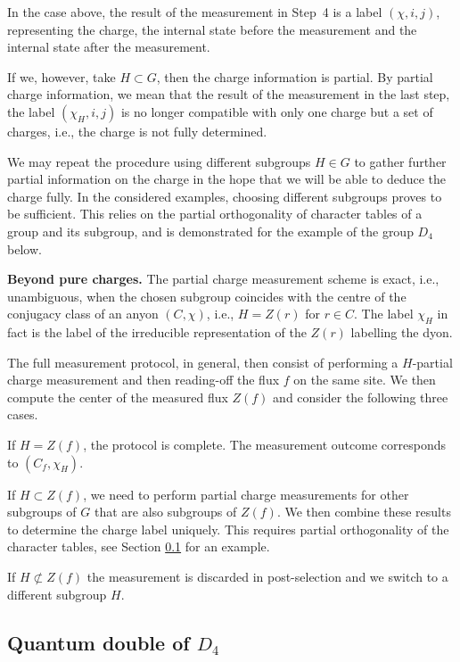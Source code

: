 \documentclass[a4paper,twocolumn,11pt, accepted=2024-06-14]{quantumarticle}
\begin{document}
In the case above, the result of the measurement in Step~4 is a label $(\chi, i, j)$, representing the charge, the internal state before the measurement and the internal state after the measurement.

If we, however, take $H \subset G$, then the charge information is partial.
By partial charge information, we mean that the result of the measurement in the last step, the label $(\chi_H, i, j)$ is no longer compatible with only one charge but a set of charges, i.e., the charge is not fully determined.

We may repeat the procedure using different subgroups $H \in G$ to gather further partial information on the charge in the hope that we will be able to deduce the charge fully. In the considered examples, choosing different subgroups proves to be sufficient. This relies on the partial orthogonality of character tables of a group and its subgroup, and is demonstrated for the example of the group $D_4$ below.

\textbf{Beyond pure charges.} The partial charge measurement scheme is exact, i.e., unambiguous, when the chosen subgroup coincides with the centre of the conjugacy class of an anyon $(C, \chi)$, i.e., $H = Z(r)$ for $r \in C$.
The label $\chi_H$ in fact is the label of the irreducible representation of the $Z(r)$ labelling the dyon.

The full measurement protocol, in general, then consist of performing a $H$-partial charge measurement and then reading-off the flux $f$ on the same site. We then compute the center of the measured flux $Z(f)$ and consider the following three cases.

If $H = Z(f)$, the protocol is complete. The measurement outcome corresponds to $(C_f, \chi_H)$.

If $H \subset Z(f)$, we need to perform partial charge measurements for other subgroups of $G$ that are also subgroups of $Z(f)$. We then combine these results to determine the charge label uniquely. This requires partial orthogonality of the character tables, see Section \ref{sec:D4_double} for an example.

If $H \not\subset Z(f)$ the measurement is discarded in post-selection and we switch to a different subgroup $H$.


\subsection{Quantum double of $D_4$}\label{sec:D4_double}
\end{document}
